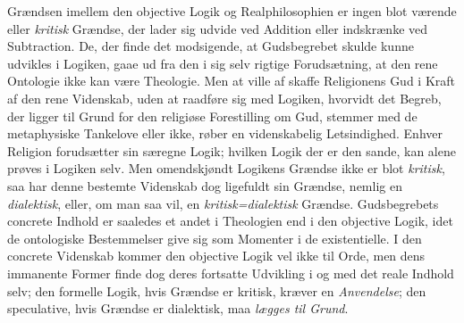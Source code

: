 \documentclass[12pt]{book}
\newcommand{\opage}[1]{\marginnote{\footnotesize\textit{[#1]}}}
\begin{document}
Grændsen imellem den objective Logik og Realphilosophien er ingen blot værende eller
\emph{kritisk} Grændse, der lader sig udvide ved Addition eller indskrænke ved Subtraction. De,
der finde det modsigende, at Gudsbegrebet skulde kunne udvikles i Logiken, gaae ud fra den i
sig selv rigtige Forudsætning, at den rene Ontologie ikke kan være Theologie. Men at ville af%
\opage{102}%
skaffe Religionens Gud i Kraft af den rene Videnskab, uden at raadføre sig med Logiken,
hvorvidt det Begreb, der ligger til Grund for den religiøse Forestilling om Gud, stemmer med de
metaphysiske Tankelove eller ikke, røber en videnskabelig Letsindighed. Enhver Religion
forudsætter sin særegne Logik; hvilken Logik der er den sande, kan alene prøves i Logiken selv.
Men omendskjøndt Logikens Grændse ikke er blot \emph{kritisk}, saa har denne bestemte Videnskab
dog ligefuldt sin Grændse, nemlig en \emph{dialektisk}, eller, om man saa vil, en
\emph{kritisk=dialektisk} Grændse. Gudsbegrebets concrete Indhold er saaledes et andet i
Theologien end i den objective Logik, idet de ontologiske Bestemmelser give sig som Momenter i
de existentielle. I den concrete Videnskab kommer den objective Logik vel ikke til Orde, men
dens immanente Former finde dog deres fortsatte Udvikling i og med det reale Indhold selv; den
formelle Logik, hvis Grændse er kritisk, kræver en \emph{Anvendelse}; den speculative, hvis
Grændse er dialektisk, maa \emph{lægges til Grund}.
\end{document}
